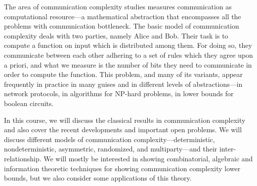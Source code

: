 The area of communication complexity studies measures communication as computational resource---a
mathematical abstraction that encompasses all the problems with communication bottleneck. The basic model
of communication complexity deals with two parties, namely Alice and Bob. Their task is to compute a
function on input which is distributed among them. For doing so, they communicate between each other
adhering to a set of rules which they agree upon a priori, and what we measure is the number of bits they
need to communicate in order to compute the function. This problem, and many of its variants, appear
frequently in practice in many guises and in different levels of abstractions---in network protocols, in
algorithms for NP-hard problems, in lower bounds for boolean circuits.

In this course, we will discuss the classical results in communication complexity and also cover the
recent developments and important open problems. We will discuss different models of communication
complexity---deterministic, nondeterministic, asymmetric, randomized, and multiparty---and their
inter-relationship. We will mostly be interested in showing combinatorial, algebraic and information
theoretic techniques for showing communication complexity lower bounds, but we also consider some
applications of this theory.